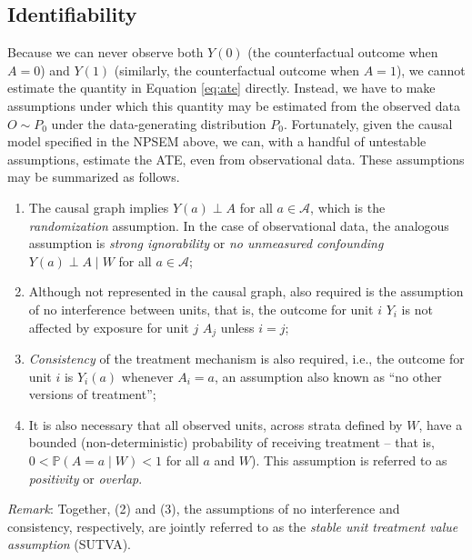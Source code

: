 \documentclass[12pt, krantz2,]{krantz}
\providecommand{\tightlist}{%
  \setlength{\itemsep}{0pt}\setlength{\parskip}{0pt}}
\theoremstyle{definition}
\theoremstyle{definition}
\theoremstyle{definition}
\renewcommand{\P}{\mathbb{P}}
\newcommand{\1}{\mathbbm{1}}
\begin{document}
\hypertarget{identifiability}{%
\subsection*{Identifiability}\label{identifiability}}


Because we can never observe both \(Y(0)\) (the counterfactual outcome when \(A=0\))
and \(Y(1)\) (similarly, the counterfactual outcome when \(A=1\)), we cannot
estimate the quantity in Equation \eqref{eq:ate} directly. Instead, we have to
make assumptions under which this quantity may be estimated from the observed
data \(O \sim P_0\) under the data-generating distribution \(P_0\). Fortunately,
given the causal model specified in the NPSEM above, we can, with a handful of
untestable assumptions, estimate the ATE, even from observational data. These
assumptions may be summarized as follows.

\begin{enumerate}
\def\labelenumi{\arabic{enumi}.}
\tightlist
\item
  The causal graph implies \(Y(a) \perp A\) for all \(a \in \mathcal{A}\), which
  is the \emph{randomization} assumption. In the case of observational data, the
  analogous assumption is \emph{strong ignorability} or \emph{no unmeasured confounding}
  \(Y(a) \perp A \mid W\) for all \(a \in \mathcal{A}\);
\item
  Although not represented in the causal graph, also required is the assumption
  of no interference between units, that is, the outcome for unit \(i\) \(Y_i\) is
  not affected by exposure for unit \(j\) \(A_j\) unless \(i=j\);
\item
  \emph{Consistency} of the treatment mechanism is also required, i.e., the outcome
  for unit \(i\) is \(Y_i(a)\) whenever \(A_i = a\), an assumption also known as ``no
  other versions of treatment'';
\item
  It is also necessary that all observed units, across strata defined by \(W\),
  have a bounded (non-deterministic) probability of receiving treatment --
  that is, \(0 < \P(A = a \mid W) < 1\) for all \(a\) and \(W\)). This assumption
  is referred to as \emph{positivity} or \emph{overlap}.
\end{enumerate}

\emph{Remark}: Together, (2) and (3), the assumptions of no interference and
consistency, respectively, are jointly referred to as the \emph{stable unit
treatment value assumption} (SUTVA).
\end{document}
